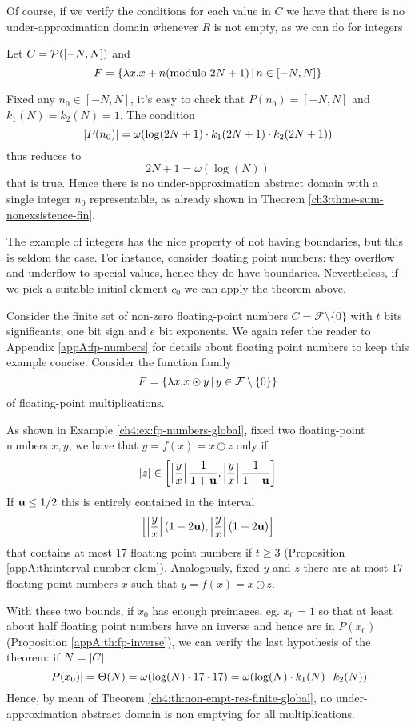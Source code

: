 Of course, if we verify the conditions for each value in $C$ we have that there is no under-approximation domain whenever $R$ is not empty, as we can do for integers
\begin{example}
	Let $C = \mathcal{P}([-N, N])$ and
	\[
	F = \{ \lambda x. x + n (\text{modulo } 2N+1) \,\vert\, n \in [-N, N] \}
	\]

	Fixed any $n_0 \in [-N, N]$, it's easy to check that $P(n_0) = [-N, N]$ and $k_1(N) = k_2(N) = 1$. The condition
	\[
	\lvert P(n_0)\rvert = \omega(\log(2N + 1) \cdot k_1(2N + 1) \cdot k_2(2N + 1))
	\]
	thus reduces to
	\[
	2N + 1 = \omega(\log(N))
	\]
	that is true. Hence there is no under-approximation abstract domain with a single integer $n_0$ representable, as already shown in Theorem \ref{ch3:th:ne-sum-nonexsistence-fin}.
\end{example}
The example of integers has the nice property of not having boundaries, but this is seldom the case. For instance, consider floating point numbers: they overflow and underflow to special values, hence they do have boundaries. Nevertheless, if we pick a suitable initial element $c_0$ we can apply the theorem above.

\begin{example}
	Consider the finite set of non-zero floating-point numbers $C = \mathcal{F} \setminus \{ 0 \}$ with $t$ bits significants, one bit sign and $e$ bit exponents. We again refer the reader to Appendix \ref{appA:fp-numbers} for details about floating point numbers to keep this example concise.
	Consider the function family
	\[
	F = \{ \lambda x . x \odot y \,\vert\, y \in \mathcal{F} \setminus \{ 0 \} \}
	\]
	of floating-point multiplications.

	As shown in Example \ref{ch4:ex:fp-numbers-global}, fixed two floating-point numbers $x, y$, we have that $y = f(x) = x \odot z$ only if
	\[
	\lvert z\rvert \in \left[ \left\lvert\frac{y}{x}\right\rvert \frac{1}{1+\textbf{u}}, \left\lvert\frac{y}{x}\right\rvert \frac{1}{1-\textbf{u}} \right]
	\]
	If $\textbf{u} \le 1 / 2$ this is entirely contained in the interval
	\[
	\left[ \left\lvert\frac{y}{x}\right\rvert (1 - 2 \textbf{u}), \left\lvert\frac{y}{x}\right\rvert (1 + 2 \textbf{u}) \right]
	\]
	that contains at most $17$ floating point numbers if $t \ge 3$ (Proposition \ref{appA:th:interval-number-elem}).
	Analogously, fixed $y$ and $z$ there are at most $17$ floating point numbers $x$ such that $y = f(x) = x \odot z$.

	With these two bounds, if $x_0$ has enough preimages, eg. $x_0 = 1$ so that at least about half floating point numbers have an inverse and hence are in $P(x_0)$ (Proposition \ref{appA:th:fp-inverse}), we can verify the last hypothesis of the theorem: if $N = \lvert C\rvert$
	\[
	\lvert P(x_0)\rvert = \Theta(N) = \omega(\log(N) \cdot 17 \cdot 17) = \omega(\log(N) \cdot k_1(N) \cdot k_2(N))
	\]
	Hence, by mean of Theorem \ref{ch4:th:non-empt-res-finite-global}, no under-approximation abstract domain is non emptying for all multiplications.
\end{example}

